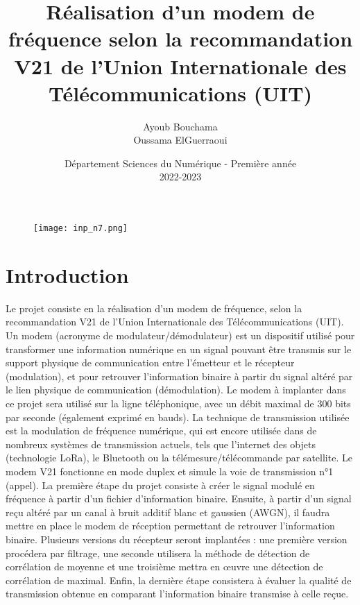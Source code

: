\documentclass[frenchb]{article}
\begin{document}
\begin{figure}[t]
\centering
\texttt{[image: inp\_n7.png]}
\end{figure}

\title{\vspace{4cm} {Réalisation d'un modem de fréquence selon la recommandation V21 de
l'Union Internationale des Télécommunications (UIT)}}
\author{Ayoub Bouchama \\ Oussama ElGuerraoui}
\date{\vspace{7cm} Département Sciences du Numérique - Première année \\
2022-2023 }

\maketitle

\newpage
\tableofcontents
\listoffigures

\newpage
\section{Introduction}
Le projet consiste en la réalisation d'un modem de fréquence, selon la recommandation V21 de l'Union Internationale des Télécommunications (UIT). Un modem (acronyme de modulateur/démodulateur) est un dispositif utilisé pour transformer une information numérique en un signal pouvant être transmis sur le support physique de communication entre l'émetteur et le récepteur (modulation), et pour retrouver l'information binaire à partir du signal altéré par le lien physique de communication (démodulation). Le modem à implanter dans ce projet sera utilisé sur la ligne téléphonique, avec un débit maximal de 300 bits par seconde (également exprimé en bauds). La technique de transmission utilisée est la modulation de fréquence numérique, qui est encore utilisée dans de nombreux systèmes de transmission actuels, tels que l'internet des objets (technologie LoRa), le Bluetooth ou la télémesure/télécommande par satellite. Le modem V21 fonctionne en mode duplex et simule la voie de transmission n°1 (appel). La première étape du projet consiste à créer le signal modulé en fréquence à partir d'un fichier d'information binaire. Ensuite, à partir d'un signal reçu altéré par un canal à bruit additif blanc et gaussien (AWGN), il faudra mettre en place le modem de réception permettant de retrouver l'information binaire. Plusieurs versions du récepteur seront implantées : une première version procédera par filtrage, une seconde utilisera la méthode de détection de corrélation de moyenne et une troisième mettra en œuvre une détection de corrélation de maximal. Enfin, la dernière étape consistera à évaluer la qualité de transmission obtenue en comparant l'information binaire transmise à celle reçue.
\end{document}
